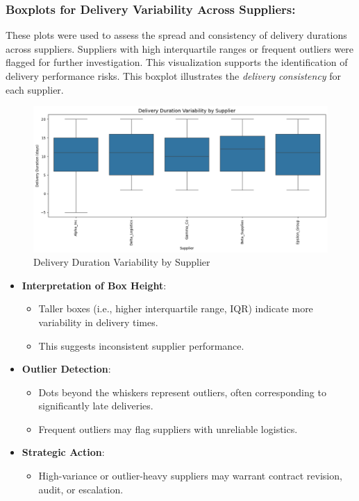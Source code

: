 \documentclass[10pt, twocolumn]{article}
\begin{document}
\subsubsection{Boxplots for Delivery Variability Across Suppliers:} 
These plots were used to assess the spread and consistency of delivery durations across suppliers. Suppliers with high interquartile ranges or frequent outliers were flagged for further investigation. This visualization supports the identification of delivery performance risks.
This boxplot illustrates the \textit{delivery consistency} for each supplier.

\begin{figure}[H]
    \centering
    \includegraphics[width=1\linewidth]{Images/delivery_boxplot.png}
    \caption{Delivery Duration Variability by Supplier}
    \label{fig:delivery-boxplot}
\end{figure}

\begin{itemize}
    \item \textbf{Interpretation of Box Height}:
    \begin{itemize}
        \item Taller boxes (i.e., higher interquartile range, IQR) indicate more variability in delivery times.
        \item This suggests inconsistent supplier performance.
    \end{itemize}
    
    \item \textbf{Outlier Detection}:
    \begin{itemize}
        \item Dots beyond the whiskers represent outliers, often corresponding to significantly late deliveries.
        \item Frequent outliers may flag suppliers with unreliable logistics.
    \end{itemize}
    
    \item \textbf{Strategic Action}:
    \begin{itemize}
        \item High-variance or outlier-heavy suppliers may warrant contract revision, audit, or escalation.
    \end{itemize}
\end{itemize}
\end{document}
